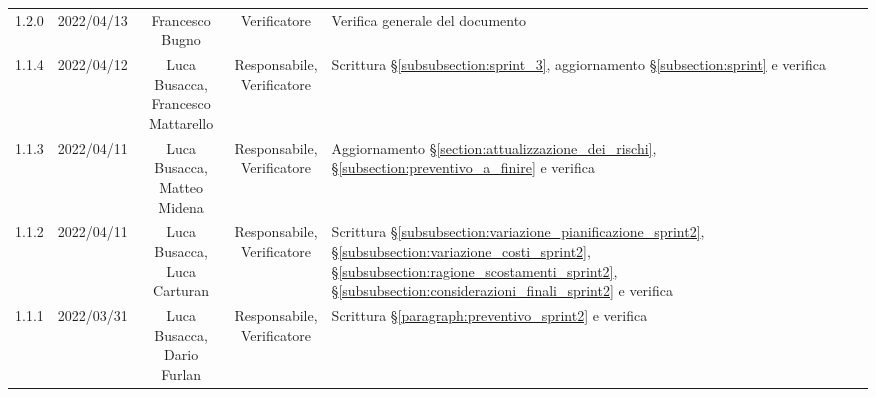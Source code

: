 \begin{center}
\begin{longtable}[c]{c | c | c | c | p{5cm}}
		1.2.0                                                      & 2022/04/13 & Francesco Bugno                        & Verificatore   & Verifica generale del documento                                                                                                           \\
		1.1.4                                                      & 2022/04/12 & \Shortunderstack{Luca Busacca,                                                                                                                                                                      \\Francesco Mattarello} & \Shortunderstack{Responsabile,\\Verificatore} & Scrittura §\ref{subsubsection:sprint_3}, aggiornamento §\ref{subsection:sprint} e verifica\\
		1.1.3                                                      & 2022/04/11 & \Shortunderstack{Luca Busacca,                                                                                                                                                                      \\Matteo Midena} & \Shortunderstack{Responsabile,\\Verificatore} & Aggiornamento §\ref{section:attualizzazione_dei_rischi}, §\ref{subsection:preventivo_a_finire} e verifica\\
		1.1.2                                                      & 2022/04/11 & \Shortunderstack{Luca Busacca,                                                                                                                                                                      \\Luca Carturan} & \Shortunderstack{Responsabile,\\Verificatore} & Scrittura §\ref{subsubsection:variazione_pianificazione_sprint2}, §\ref{subsubsection:variazione_costi_sprint2}, §\ref{subsubsection:ragione_scostamenti_sprint2}, §\ref{subsubsection:considerazioni_finali_sprint2} e verifica\\
		1.1.1                                                      & 2022/03/31 & \Shortunderstack{Luca Busacca,                                                                                                                                                                      \\Dario Furlan} & \Shortunderstack{Responsabile,\\Verificatore} & Scrittura §\ref{paragraph:preventivo_sprint2} e verifica\\

\end{longtable}
\end{center}
